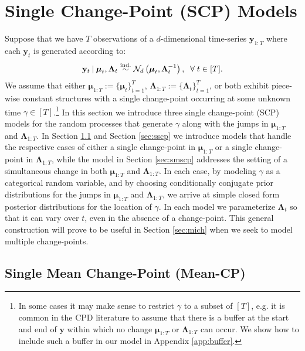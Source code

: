 \section{Single Change-Point (SCP) Models}
\label{sec:scp}

Suppose that we have $T$ observations of a $d$-dimensional time-series $\mathbf{y}_{1:T}$ where each $\mathbf{y}_t$ is generated according to:
\begin{align}\label{eq:dgp}
    \mathbf{y}_t \:|\: \boldsymbol{\mu}_t, \boldsymbol{\Lambda}_t \overset{\text{ind.}}{\sim} \mathcal{N}_d\left(\boldsymbol{\mu}_t, \boldsymbol{\Lambda}^{-1}_t\right), \;\;\forall\; t \in [T].
\end{align}
We assume that either $\boldsymbol{\mu}_{1:T} := \{\boldsymbol{\mu}_t\}_{t=1}^{T}$, $\boldsymbol{\Lambda}_{1:T} := \{\boldsymbol{\Lambda}_t\}^{T}_{t=1}$, or both exhibit piece-wise constant structures with a single change-point occurring at some unknown time $\gamma \in [T]$.\footnote{In some cases it may make sense to restrict $\gamma$ to a subset of $[T]$, e.g. it is common in the CPD literature to assume that there is a buffer at the start and end of $\mathbf{y}$ within which no change $\boldsymbol{\mu}_{1:T}$ or $\boldsymbol{\Lambda}_{1:T}$ can occur. We show how to include such a buffer in our model in Appendix \ref{app:buffer}.} In this section we introduce three single change-point (SCP) models for the random processes that generate $\gamma$ along with the jumps in $\boldsymbol{\mu}_{1:T}$ and $\boldsymbol{\Lambda}_{1:T}$. In Section \ref{sec:smcp} and Section \ref{sec:sscp} we introduce models that handle the respective cases of either a single change-point in $\boldsymbol{\mu}_{1:T}$ or a single change-point in $\boldsymbol{\Lambda}_{1:T}$, while the model in Section \ref{sec:smscp} addresses the setting of a simultaneous change in both $\boldsymbol{\mu}_{1:T}$ and $\boldsymbol{\Lambda}_{1:T}$. In each case, by modeling $\gamma$ as a categorical random variable, and by choosing conditionally conjugate prior distributions for the jumps in $\boldsymbol{\mu}_{1:T}$ and $\boldsymbol{\Lambda}_{1:T}$, we arrive at simple closed form posterior distributions for the location of $\gamma$. In each model we parameterize $\boldsymbol{\Lambda}_t$ so that it can vary over $t$, even in the absence of a change-point. This general construction will prove to be useful in Section \ref{sec:mich} when we seek to model multiple change-points.

\subsection{Single Mean Change-Point (Mean-CP)}
\label{sec:smcp}


